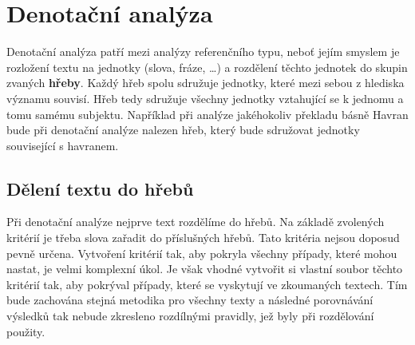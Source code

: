 \documentclass[dp.tex]{subfiles}
\begin{document}
\chapter{Denotační analýza}
\label{chap:denotacni_analyza}

Denotační analýza patří mezi analýzy referenčního typu, neboť jejím smyslem je rozložení textu na jednotky (slova, fráze, \ldots) a rozdělení těchto jednotek do skupin zvaných \textbf{hřeby}. Každý hřeb spolu sdružuje jednotky, které mezi sebou z hlediska významu souvisí. Hřeb tedy sdružuje všechny jednotky vztahující se k jednomu a tomu samému subjektu. Například při analýze jakéhokoliv překladu básně Havran bude při denotační analýze nalezen hřeb, který bude sdružovat jednotky související s havranem.

\section{Dělení textu do hřebů}

Při denotační analýze nejprve text rozdělíme do hřebů. Na základě zvolených kritérií je třeba slova zařadit do příslušných hřebů. Tato kritéria nejsou doposud pevně určena. Vytvoření kritérií tak, aby pokryla všechny případy, které mohou nastat, je velmi komplexní úkol. Je však vhodné vytvořit si vlastní soubor těchto kritérií tak, aby pokrýval případy, které se vyskytují ve zkoumaných textech. Tím bude zachována stejná metodika pro všechny texty a následné porovnávání výsledků tak nebude zkresleno rozdílnými pravidly, jež byly při rozdělování použity.
\end{document}
